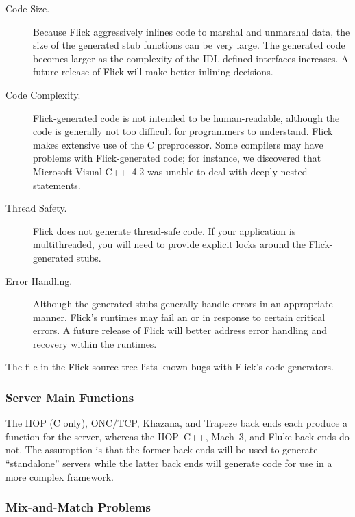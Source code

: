 \begin{description}
  \item[Code Size.]  Because Flick aggressively inlines code to marshal and
  unmarshal data, the size of the generated stub functions can be very large.
  The generated code becomes larger as the complexity of the IDL-defined
  interfaces increases.  A future release of Flick will make better inlining
  decisions.

  \item[Code Complexity.]  Flick-generated code is not intended to be
  human-readable, although the code is generally not too difficult for
  programmers to understand.  Flick makes extensive use of the C preprocessor.
  Some compilers may have problems with Flick-generated code; for instance, we
  discovered that Microsoft Visual C++~4.2 was unable to deal with
  deeply nested  statements.

  \item[Thread Safety.]  Flick does not generate thread-safe code.  If your
  application is multithreaded, you will need to provide explicit locks around
  the Flick-generated stubs.

  \item[Error Handling.]  Although the generated stubs generally handle errors
  in an appropriate manner, Flick's runtimes may fail an  or
   in response to certain critical errors.  A future release of
  Flick will better address error handling and recovery within the runtimes.
\end{description}

\noindent The  file in the Flick source tree lists known
bugs with Flick's code generators.

\subsubsection{Server Main Functions}
\label{subsubsec:BE:Server Main Functions}

The IIOP (C only), ONC/TCP, Khazana, and Trapeze back ends each produce a
 function for the server, whereas the IIOP~C++, Mach~3, and
Fluke back ends do not.  The assumption is that the former back ends will be
used to generate ``standalone'' servers while the latter back ends will
generate code for use in a more complex framework.

\subsubsection{Mix-and-Match Problems}
\label{subsubsec:BE:Mix-and-Match Problems}

